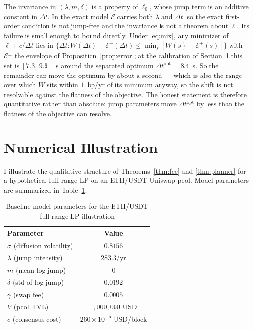 \documentclass[runningheads]{llncs}
\newcommand{\dt}{\Delta t}
\newcommand{\1}{\mathbf{1}}
\begin{document}
\begin{remark}\label{rem:exactfoc}
The invariance in $(\lambda,m,\delta)$ is a property of $\ell_0$, whose jump term is an additive constant in $\dt$. In the exact model $\mathcal{E}$ carries both $\lambda$ and $\dt$, so the exact first-order condition is not jump-free and the invariance is not a theorem about $\ell$. Its failure is small enough to bound directly. Under \eqref{eq:mix}, any minimizer of $\ell+c/\dt$ lies in $\{\dt: W(\dt)+\mathcal{E}^-(\dt) \le \min_s [W(s)+\mathcal{E}^+(s)]\}$ with $\mathcal{E}^\pm$ the envelope of Proposition~\ref{prop:error}; at the calibration of Section~\ref{sec:numerics} this set is $[7.3,\,9.9]$~s around the separated optimum $\dt^{\mathrm{opt}}=8.4$~s. So the remainder can move the optimum by about a second --- which is also the range over which $W$ sits within $1$~bp/yr of its minimum anyway, so the shift is not resolvable against the flatness of the objective. The honest statement is therefore quantitative rather than absolute: jump parameters move $\dt^{\mathrm{opt}}$ by less than the flatness of the objective can resolve.
\end{remark}

\section{Numerical Illustration}\label{sec:numerics}

I illustrate the qualitative structure of Theorems~\ref{thm:fee} and \ref{thm:planner} for a hypothetical full-range LP on an ETH/USDT Uniswap pool. Model parameters are summarized in Table~\ref{tab:params}.

\begin{table}[htbp]
\centering
\caption{Baseline model parameters for the ETH/USDT full-range LP illustration}\label{tab:params}
\begin{tabular}{lc}
\toprule
Parameter & Value \\
\midrule
$\sigma$ (diffusion volatility) & $0.8156$ \\
$\lambda$ (jump intensity) & $283.3$/yr \\
$m$ (mean log jump) & $0$ \\
$\delta$ (std of log jump) & $0.0192$ \\
$\gamma$ (swap fee) & $0.0005$ \\
$V$ (pool TVL) & $1{,}000{,}000$ USD \\
$c$ (consensus cost) & $260 \times 10^{-5}$ USD/block \\
\bottomrule
\end{tabular}
\end{table}
\end{document}
